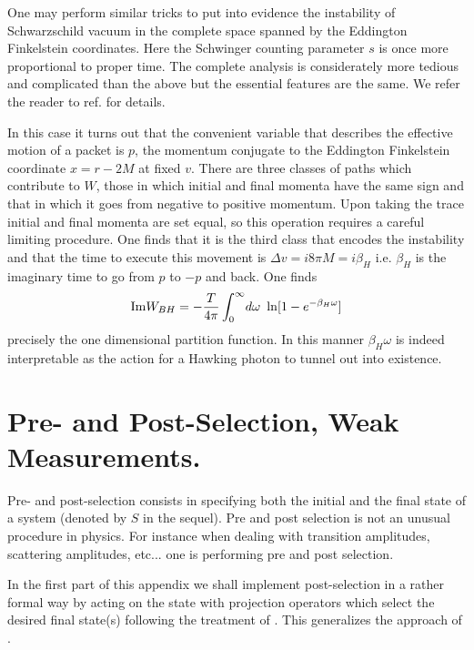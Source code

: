\documentclass[12pt,oneside]{report}
\begin{document}
One may perform similar tricks to put into evidence the
instability of Schwarzschild vacuum in the complete space spanned
by the Eddington Finkelstein coordinates. Here the Schwinger
counting parameter $ s $ is once more proportional to proper
time. The complete analysis is considerately more tedious and
complicated than the above but the essential features are the
same. We  refer the reader
to ref. \cite{PaBr0} for details.

In this case it turns out that the convenient variable that
describes the effective motion of a packet is $ p $, the momentum
conjugate to the Eddington Finkelstein
 coordinate $x= r - 2 M $ at fixed $v$. There are three
classes of paths which contribute to $ W $, those in which initial
and final momenta have the same sign and that in which it goes from
negative to positive momentum. Upon taking the trace initial and
final momenta are set equal, so this operation requires a
careful limiting procedure. One finds that it is the third class
that encodes the instability and that the time to execute this
movement is $ \Delta v = i 8 \pi M = i \beta_H $ i.e. $ \beta_H
$ is the imaginary time to go from $p$ to $- p$ and back. One finds 
\begin{eqnarray}
{\rm I m} W_{BH} = - {T \over 4 \pi } \int _{0} ^{\infty} \!d \omega
\ \ln [ 1 - e^{- \beta_H \omega} ] \nonumber\\
\end{eqnarray}
precisely the one dimensional partition function. In this manner
$ \beta_H \omega $ is indeed interpretable as the action for a
Hawking photon to tunnel out into existence.







\chapter{
Pre- and Post-Selection, Weak Measurements. }\label{weak}



Pre- and post-selection consists in specifying both the initial and the final
state of a system (denoted by $S$
in the sequel). 
Pre and post selection is not an unusual procedure in
physics. For instance when dealing with transition amplitudes, scattering
amplitudes, etc... one is performing pre and post selection. 

In the first part of this appendix we shall implement post-selection in a 
rather formal way by acting on the state with projection operators which select
the desired final state(s) following the treatment of
\cite{MaPa}. This generalizes the approach of \cite{Ahar}.
\end{document}
